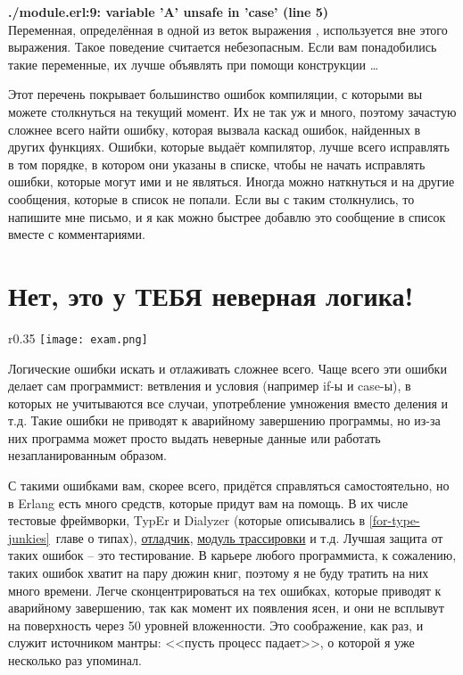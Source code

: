 \blankline
\begin{minipage}{\textwidth}
    \textbf{./module.erl:9: variable 'A' unsafe in 'case' (line 5)}\\
    Переменная, определённая в одной из веток выражения , используется вне этого выражения.
    Такое поведение считается небезопасным.
    Если вам понадобились такие переменные, их лучше объявлять при помощи конструкции \ldots
\end{minipage}

Этот перечень покрывает большинство ошибок компиляции, с которыми вы можете столкнуться на текущий момент. Их не так уж и много, поэтому зачастую сложнее всего найти ошибку, которая вызвала каскад ошибок, найденных в других функциях.
Ошибки, которые выдаёт компилятор, лучше всего исправлять в том порядке, в котором они указаны в списке, чтобы не начать исправлять ошибки, которые могут ими и не являться.
Иногда можно наткнуться и на другие сообщения, которые в список не попали.
Если вы с таким столкнулись, то напишите мне письмо, и я как можно быстрее добавлю это сообщение в список вместе с комментариями.
\section{Нет, это у ТЕБЯ неверная логика!}
\label{no-your-logic-is-wrong}
\begin{wrapfigure}{r}{0.35\linewidth}
    \texttt{[image: exam.png]}
\end{wrapfigure}
Логические ошибки искать и отлаживать сложнее всего. Чаще всего эти ошибки делает сам программист: ветвления и условия (например if\--ы и case\--ы), в которых не учитываются все случаи, употребление умножения вместо деления и т.д.
Такие ошибки не приводят к аварийному завершению программы, но из\--за них программа может просто выдать неверные данные или работать незапланированным образом.

С такими ошибками вам, скорее всего, придётся справляться самостоятельно, но в Erlang есть много средств, которые придут вам на помощь.
В их числе тестовые фреймворки, TypEr и Dialyzer (которые описывались в \ref{for-type-junkies}~главе о типах), \href{http://www.erlang.org/doc/apps/debugger/debugger\_chapter.html}{отладчик}, \href{http://erldocs.com/R15B/runtime\_tools/dbg.html}{модуль трассировки} и т.д.
Лучшая защита от таких ошибок \--- это тестирование.
В карьере любого программиста, к сожалению, таких ошибок хватит на пару дюжин книг, поэтому я не буду тратить на них много времени.
Легче сконцентрироваться на тех ошибках, которые приводят к аварийному завершению, так как момент их появления ясен, и они не всплывут на поверхность через 50 уровней вложенности.
Это соображение, как раз, и служит источником мантры: <<пусть процесс падает>>, о которой я уже несколько раз упоминал.
